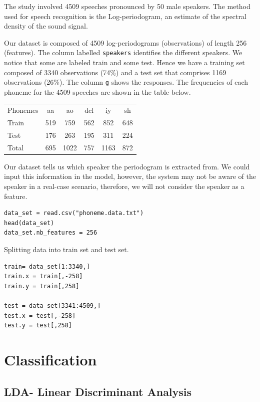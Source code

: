 \documentclass[]{report}
\begin{document}
The study involved 4509 speeches pronounced by 50 male speakers. The method used for speech recognition is the Log-periodogram, an estimate of the spectral density of the sound signal.

Our dataset is composed of 4509 log-periodograms (observations) of length 256 (features). The column labelled \texttt{speakers} identifies the different speakers. We notice that some are labeled train and some test. Hence we have a training set composed of 3340 observations (74\%) and a test set that comprises 1169 observations (26\%). The column \texttt{g} shows the responses. The frequencies of each phoneme for the 4509 speeches are shown in the table below.

\begin{center}
\begin{tabular}{l c c c c c}
 Phonemes	 & aa &  ao & dcl & iy & sh \\
Train & 519 & 759 & 562 & 852 & 648\\
Test  & 176 & 263 & 195 & 311 & 224\\
Total & 695 & 1022 & 757 & 1163 & 872
\end{tabular}
\end{center}

Our dataset tells us which speaker the periodogram is extracted from. We could input this information in the model, however, the system may not be aware of the speaker in a real-case scenario, therefore, we will not consider the speaker as a feature. 

\begin{lstlisting}
data_set = read.csv("phoneme.data.txt")
head(data_set)
data_set.nb_features = 256
\end{lstlisting}

Splitting data into train set and test set.
\begin{lstlisting}
train= data_set[1:3340,]
train.x = train[,-258]
train.y = train[,258]

test = data_set[3341:4509,]
test.x = test[,-258]
test.y = test[,258]
\end{lstlisting}

\section{Classification}


\subsection{LDA- Linear Discriminant Analysis}
\end{document}
